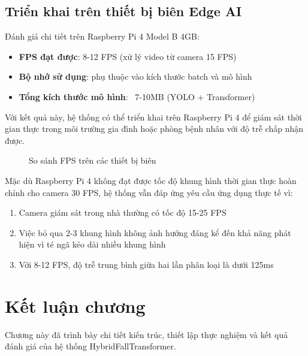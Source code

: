 \subsection{Triển khai trên thiết bị biên Edge AI}
\label{sec:edge_deployment}

Đánh giá chi tiết trên Raspberry Pi 4 Model B 4GB:

\begin{itemize}
    \item \textbf{FPS đạt được}: 8-12 FPS (xử lý video từ camera 15 FPS)
    \item \textbf{Bộ nhớ sử dụng}: phụ thuộc vào kích thước batch và mô hình
    \item \textbf{Tổng kích thước mô hình}: ~7-10MB (YOLO + Transformer)
\end{itemize}

Với kết quả này, hệ thống có thể triển khai trên Raspberry Pi 4 để giám sát thời gian thực trong môi trường gia đình hoặc phòng bệnh nhân với độ trễ chấp nhận được.

\begin{figure}[h]
    \centering
    \caption[So sánh FPS trên các thiết bị]{So sánh FPS trên các thiết bị biên}
    \label{fig:edge_benchmark}
\end{figure}

Mặc dù Raspberry Pi 4 không đạt được tốc độ khung hình thời gian thực hoàn chỉnh cho camera 30 FPS, hệ thống vẫn đáp ứng yêu cầu ứng dụng thực tế vì:

\begin{enumerate}
    \item Camera giám sát trong nhà thường có tốc độ 15-25 FPS
    \item Việc bỏ qua 2-3 khung hình không ảnh hưởng đáng kể đến khả năng phát hiện vì té ngã kéo dài nhiều khung hình
    \item Với 8-12 FPS, độ trễ trung bình giữa hai lần phân loại là dưới 125ms
\end{enumerate}


\section{Kết luận chương}
\label{sec:chapter_summary}

Chương này đã trình bày chi tiết kiến trúc, thiết lập thực nghiệm và kết quả đánh giá của hệ thống HybridFallTransformer.

